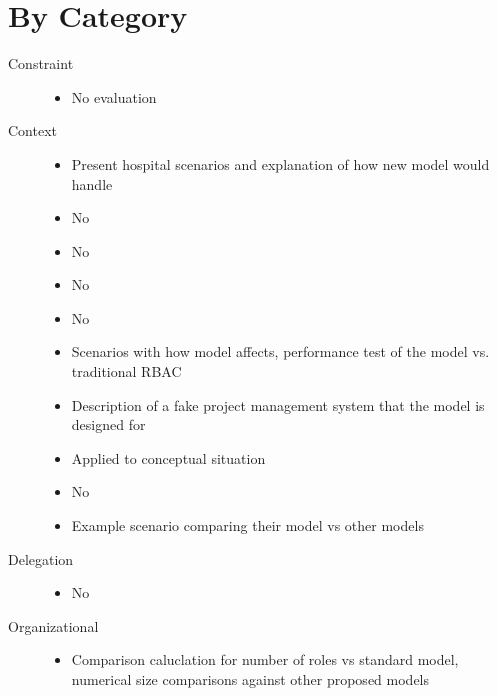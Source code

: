 \documentclass[letterpaper,10pt,english]{sphinxmanual}
\begin{document}
\section{By Category}
\label{research_questions/RQ_6:by-category}\begin{description}
\item[{Constraint}] \leavevmode\begin{itemize}
\item {} 
No evaluation

\end{itemize}

\item[{Context}] \leavevmode\begin{itemize}
\item {} 
Present hospital scenarios and explanation of how new model would handle

\item {} 
No

\item {} 
No

\item {} 
No

\item {} 
No

\item {} 
Scenarios with how model affects, performance test of the model vs. traditional RBAC

\item {} 
Description of a fake project management system that the model is designed for

\item {} 
Applied to conceptual situation

\item {} 
No

\item {} 
Example scenario comparing their model vs other models

\end{itemize}

\item[{Delegation}] \leavevmode\begin{itemize}
\item {} 
No

\end{itemize}

\item[{Organizational}] \leavevmode\begin{itemize}
\item {} 
Comparison caluclation for number of roles vs standard model, numerical size comparisons against other proposed models


\end{itemize}
\end{description}
\end{document}

